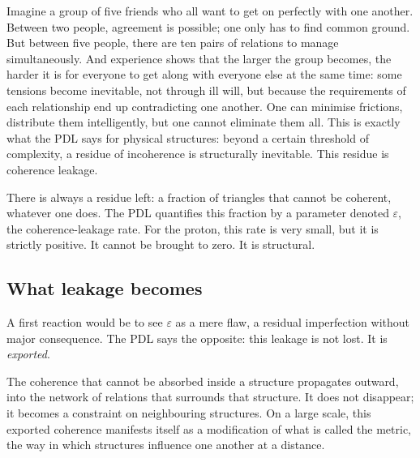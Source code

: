 \documentclass[12pt, a4paper, openright]{book}
\begin{document}
Imagine a group of five friends who all want to get on perfectly with one another. Between two people, agreement is possible; one only has to find common ground. But between five people, there are ten pairs of relations to manage simultaneously. And experience shows that the larger the group becomes, the harder it is for everyone to get along with everyone else at the same time: some tensions become inevitable, not through ill will, but because the requirements of each relationship end up contradicting one another. One can minimise frictions, distribute them intelligently, but one cannot eliminate them all. This is exactly what the PDL says for physical structures: beyond a certain threshold of complexity, a residue of incoherence is structurally inevitable. This residue is coherence leakage.

\medskip

There is always a residue left: a fraction of triangles that cannot be coherent, whatever one does. The PDL quantifies this fraction by a parameter denoted $\varepsilon$, the coherence-leakage rate. For the proton, this rate is very small, but it is strictly positive. It cannot be brought to zero. It is structural.

\subsection*{What leakage becomes}

A first reaction would be to see $\varepsilon$ as a mere flaw, a residual imperfection without major consequence. The PDL says the opposite: this leakage is not lost. It is \emph{exported}.

\medskip

The coherence that cannot be absorbed inside a structure propagates outward, into the network of relations that surrounds that structure. It does not disappear; it becomes a constraint on neighbouring structures. On a large scale, this exported coherence manifests itself as a modification of what is called the metric, the way in which structures influence one another at a distance.

\medskip
\end{document}
